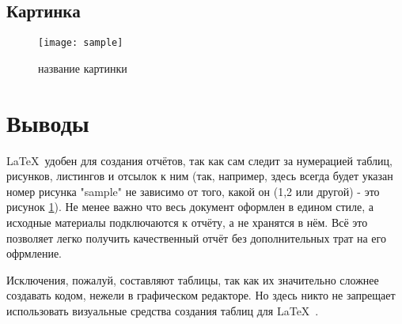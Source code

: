 
\parindent=1cm


\parindent=1cm

\subsection{Картинка}

\begin{figure}[H]
	\begin{center}
		\texttt{[image: sample]}
		\caption{название картинки} 
		\label{pic:pic_name} %
	\end{center}
\end{figure}






\section{Выводы}
\LaTeX\ удобен для создания отчётов, так как сам следит за нумерацией таблиц, рисунков, листингов и отсылок к ним (так, например, здесь всегда будет указан номер рисунка "sample" не зависимо от того, какой он (1,2 или другой) - это рисунок \ref{pic:pic_name}). Не менее важно что весь документ оформлен в едином стиле, а исходные материалы подключаются к отчёту, а не хранятся в нём. Всё это позволяет легко получить качественный отчёт без дополнительных трат на его офрмление.

Исключения, пожалуй, составляют таблицы, так как их значительно сложнее создавать кодом, нежели в графическом редакторе. Но здесь никто не запрещает использовать визуальные средства создания таблиц для \LaTeX\ .

